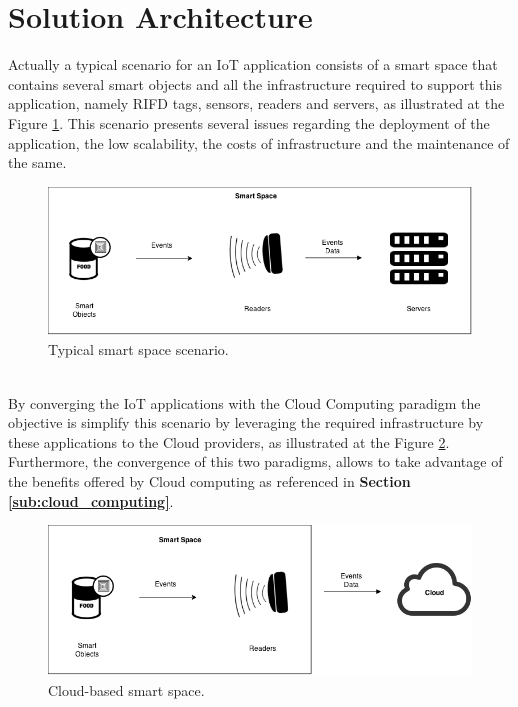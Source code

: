 \section{Solution Architecture}
\label{sec:solution_architecture}
Actually a typical scenario for an IoT application consists of a smart space that contains several smart objects and all
the infrastructure required to support this application, namely RIFD tags, sensors, readers and servers, as illustrated at the
Figure \ref{fig:smart-space}. This scenario presents several issues regarding the deployment of the application, the low scalability, the costs of infrastructure
and the maintenance of the same.
\begin{figure}[h!]
  \centering
  \includegraphics[width=\textwidth]{./images/smart-space}
  \caption{Typical smart space scenario.}
  \label{fig:smart-space}
\end{figure}\\
By converging the IoT applications with the Cloud Computing paradigm the objective is simplify this scenario by leveraging the required infrastructure by these applications to the Cloud providers,
as illustrated at the Figure \ref{fig:smart-space-cloud}. Furthermore, the convergence of this two paradigms, allows to take advantage of the benefits offered by Cloud computing as referenced
in \textbf{Section \ref{sub:cloud_computing}}.
\begin{figure}
  \centering
  \includegraphics[width=\textwidth]{./images/smart-space-cloud}
  \caption{Cloud-based smart space.}
  \label{fig:smart-space-cloud}
\end{figure}\\
